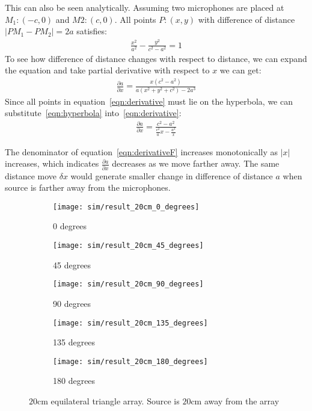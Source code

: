 This can also be seen analytically. Assuming two microphones are placed at $M_1:(-c,0)$ and $M2:(c,0)$. All points $P:(x,y)$ with difference of distance $ |PM_1 - PM_2| = 2a$ satisfies:
\begin{eqnarray}\label{eqn:hyperbola}
\frac{x^2}{a^2} - \frac{y^2}{c^2-a^2} = 1
\end{eqnarray}
To see how difference of distance changes with respect to distance, we can expand the equation and take partial derivative with respect to $x$ we can get:
\begin{eqnarray}\label{eqn:derivative}
\frac{\partial a}{\partial x} = \frac{x(c^2-a^2)}{a(x^2+y^2+c^2)-2a^3}
\end{eqnarray}
Since all points in equation~\ref{eqn:derivative} must lie on the hyperbola, we can substitute~\ref{eqn:hyperbola} into~\ref{eqn:derivative}:
\begin{eqnarray}\label{eqn:derivativeF}
\frac{\partial a}{\partial x} = \frac{c^2-a^2}{\frac{c^2}{a}x - \frac{a^3}{x}}
\end{eqnarray}

The denominator of equation~\ref{eqn:derivativeF} increases monotonically as $|x|$ increases, which indicates $\frac{\partial a}{\partial x}$ decreases as we move farther away. The same distance move $\delta x$ would generate smaller change in difference of distance $a$ when source is farther away from the microphones. 

\begin{figure*}[]
  \centering
  \begin{subfigure}[]{.3\textwidth}
    \texttt{[image: sim/result\_20cm\_0\_degrees]}
    \caption{0 degrees}
  \end{subfigure}
  \begin{subfigure}[]{.3\textwidth}
    \texttt{[image: sim/result\_20cm\_45\_degrees]}
    \caption{45 degrees}
  \end{subfigure}
  \begin{subfigure}[]{.3\textwidth}
    \texttt{[image: sim/result\_20cm\_90\_degrees]}
    \caption{90 degrees}
  \end{subfigure}
  \begin{subfigure}[]{.3\textwidth}
    \texttt{[image: sim/result\_20cm\_135\_degrees]}
    \caption{135 degrees}
  \end{subfigure}
  \begin{subfigure}[]{.3\textwidth}
    \texttt{[image: sim/result\_20cm\_180\_degrees]}
    \caption{180 degrees}
  \end{subfigure}
  \caption{$20$cm equilateral triangle array. Source is $20$cm away from the array}
  \label{fig:sim_3_2}
\end{figure*}

